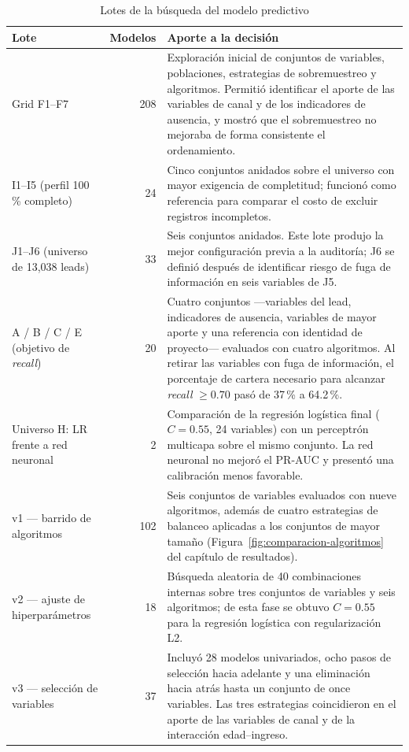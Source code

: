 \begin{table}[H]
\centering
\caption{Lotes de la búsqueda del modelo predictivo}
\label{anx:cuad-pred-fases}
\small
\begin{tabular}{p{3.6cm}rp{7.1cm}}
\hline
\textbf{Lote} & \textbf{Modelos} & \textbf{Aporte a la decisión} \\
\hline
Grid F1--F7 & 208 & Exploración inicial de conjuntos de variables, poblaciones, estrategias de sobremuestreo y algoritmos. Permitió identificar el aporte de las variables de canal y de los indicadores de ausencia, y mostró que el sobremuestreo no mejoraba de forma consistente el ordenamiento. \\
I1--I5 (perfil 100\,\% completo) & 24 & Cinco conjuntos anidados sobre el universo con mayor exigencia de completitud; funcionó como referencia para comparar el costo de excluir registros incompletos. \\
J1--J6 (universo de 13{,}038 leads) & 33 & Seis conjuntos anidados. Este lote produjo la mejor configuración previa a la auditoría; J6 se definió después de identificar riesgo de fuga de información en seis variables de J5. \\
A / B / C / E (objetivo de \emph{recall}) & 20 & Cuatro conjuntos ---variables del lead, indicadores de ausencia, variables de mayor aporte y una referencia con identidad de proyecto--- evaluados con cuatro algoritmos. Al retirar las variables con fuga de información, el porcentaje de cartera necesario para alcanzar \emph{recall} $\geq 0.70$ pasó de 37\,\% a 64.2\,\%. \\
Universo H: LR frente a red neuronal & 2 & Comparación de la regresión logística final ($C=0.55$, 24 variables) con un perceptrón multicapa sobre el mismo conjunto. La red neuronal no mejoró el PR-AUC y presentó una calibración menos favorable. \\
v1 --- barrido de algoritmos & 102 & Seis conjuntos de variables evaluados con nueve algoritmos, además de cuatro estrategias de balanceo aplicadas a los conjuntos de mayor tamaño (Figura~\ref{fig:comparacion-algoritmos} del capítulo de resultados). \\
v2 --- ajuste de hiperparámetros & 18 & Búsqueda aleatoria de 40 combinaciones internas sobre tres conjuntos de variables y seis algoritmos; de esta fase se obtuvo $C=0.55$ para la regresión logística con regularización L2. \\
v3 --- selección de variables & 37 & Incluyó 28 modelos univariados, ocho pasos de selección hacia adelante y una eliminación hacia atrás hasta un conjunto de once variables. Las tres estrategias coincidieron en el aporte de las variables de canal y de la interacción edad--ingreso. \\

\end{tabular}
\end{table}
